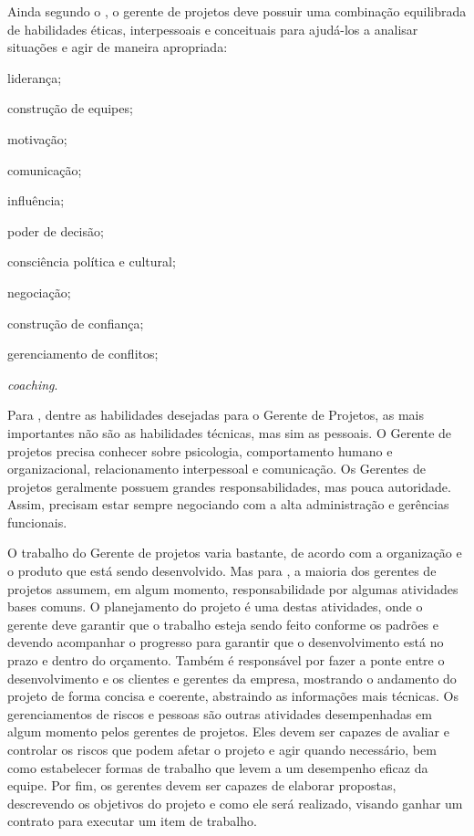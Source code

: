 \documentclass[
    12pt,               %
    openright,          %
    twoside,            %
    a4paper,            %
    chapter=TITLE,     %
    english,            %
    spanish,            %
    portuguese              %
    ]{abntex2}
\begin{document}
Ainda segundo o , o gerente de projetos deve possuir uma combinação equilibrada de habilidades éticas, interpessoais e conceituais para ajudá-los a analisar situações e agir de maneira apropriada:

\begin{alineas}
	\item liderança;
	\item construção de equipes;
	\item motivação;
	\item comunicação;
	\item influência;
	\item poder de decisão;
	\item consciência política e cultural;
	\item negociação;
	\item construção de confiança;
	\item gerenciamento de conflitos;
	\item \textit{coaching}.
\end{alineas}

Para , dentre as habilidades desejadas para o Gerente de Projetos, as mais importantes não são as habilidades técnicas, mas sim as pessoais. O Gerente de projetos precisa conhecer sobre psicologia, comportamento humano e organizacional, relacionamento interpessoal e comunicação. Os Gerentes de projetos geralmente possuem grandes responsabilidades, mas pouca autoridade. Assim, precisam estar sempre negociando com a alta administração e gerências funcionais.

O trabalho do Gerente de projetos varia bastante, de acordo com a organização e o produto que está sendo desenvolvido. Mas para , a maioria dos gerentes de projetos assumem, em algum momento, responsabilidade por algumas atividades bases comuns. O planejamento do projeto é uma destas atividades, onde o gerente deve garantir que o trabalho esteja sendo feito conforme os padrões e devendo acompanhar o progresso para garantir que o desenvolvimento está no prazo e dentro do orçamento. Também é responsável por fazer a ponte entre o desenvolvimento e os clientes e gerentes da empresa, mostrando o andamento do projeto de forma concisa e coerente, abstraindo as informações mais técnicas. Os gerenciamentos de riscos e pessoas são outras atividades desempenhadas em algum momento pelos gerentes de projetos. Eles devem ser capazes de avaliar e controlar os riscos que podem afetar o projeto e agir quando necessário, bem como estabelecer formas de trabalho que levem a um desempenho eficaz da equipe. Por fim, os gerentes devem ser capazes de elaborar propostas, descrevendo os objetivos do projeto e como ele será realizado, visando ganhar um contrato para executar um item de trabalho.
\end{document}
